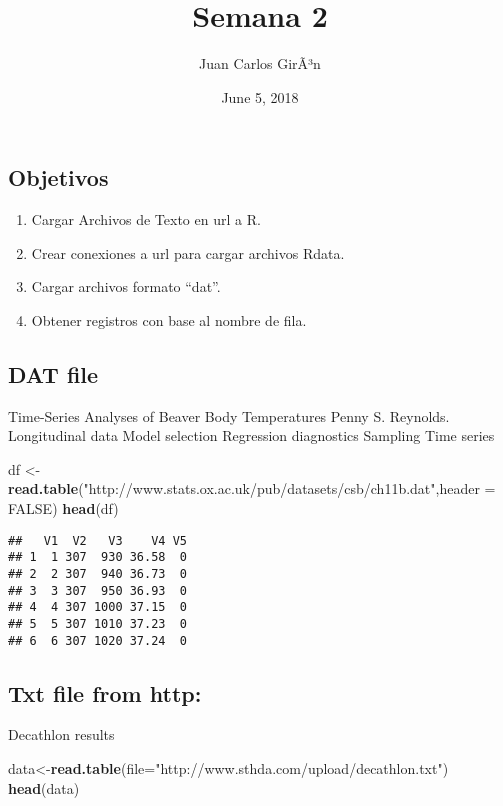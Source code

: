 \documentclass[]{article}
\title{Semana 2}
\author{Juan Carlos GirÃ³n}
\date{June 5, 2018}
\newenvironment{Shaded}{\begin{snugshade}}{\end{snugshade}}
\newcommand{\KeywordTok}[1]{\textcolor[rgb]{0.13,0.29,0.53}{\textbf{#1}}}
\newcommand{\DataTypeTok}[1]{\textcolor[rgb]{0.13,0.29,0.53}{#1}}
\newcommand{\StringTok}[1]{\textcolor[rgb]{0.31,0.60,0.02}{#1}}
\newcommand{\OtherTok}[1]{\textcolor[rgb]{0.56,0.35,0.01}{#1}}
\newcommand{\NormalTok}[1]{#1}
\providecommand{\tightlist}{%
  \setlength{\itemsep}{0pt}\setlength{\parskip}{0pt}}
\begin{document}
\maketitle

\subsection{Objetivos}\label{objetivos}

\begin{enumerate}
\def\labelenumi{\arabic{enumi}.}
\tightlist
\item
  Cargar Archivos de Texto en url a R.
\item
  Crear conexiones a url para cargar archivos Rdata.
\item
  Cargar archivos formato ``dat''.
\item
  Obtener registros con base al nombre de fila.
\end{enumerate}

\subsection{DAT file}\label{dat-file}

Time-Series Analyses of Beaver Body Temperatures Penny S. Reynolds.
Longitudinal data Model selection Regression diagnostics Sampling Time
series

\begin{Shaded}
\begin{Highlighting}[]
\NormalTok{df <-}\StringTok{ }\KeywordTok{read.table}\NormalTok{(}\StringTok{"http://www.stats.ox.ac.uk/pub/datasets/csb/ch11b.dat"}\NormalTok{,}\DataTypeTok{header =} \OtherTok{FALSE}\NormalTok{)}
\KeywordTok{head}\NormalTok{(df)}
\end{Highlighting}
\end{Shaded}

\begin{verbatim}
##   V1  V2   V3    V4 V5
## 1  1 307  930 36.58  0
## 2  2 307  940 36.73  0
## 3  3 307  950 36.93  0
## 4  4 307 1000 37.15  0
## 5  5 307 1010 37.23  0
## 6  6 307 1020 37.24  0
\end{verbatim}

\subsection{Txt file from http:}\label{txt-file-from-http}

Decathlon results

\begin{Shaded}
\begin{Highlighting}[]
\NormalTok{data<-}\KeywordTok{read.table}\NormalTok{(}\DataTypeTok{file=}\StringTok{"http://www.sthda.com/upload/decathlon.txt"}\NormalTok{) }
\KeywordTok{head}\NormalTok{(data)}
\end{Highlighting}
\end{Shaded}
\end{document}
